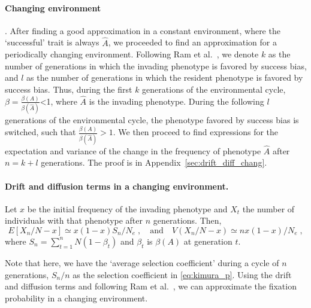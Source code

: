 \documentclass[12pt]{extarticle}
\begin{document}


\paragraph*{Changing environment}. After finding a good approximation in a constant environment, where the `successful' trait is always $\hat{A}$, we proceeded to find an approximation for a periodically changing environment. 
Following Ram et al.~\citep{changeEnv}, we denote $k$ as the number of generations in which the invading phenotype is favored by success bias, and $l$ as the number of generations in which the resident phenotype is favored by success bias.
Thus, during the first $k$ generations of the environmental cycle, $\beta=\frac{\beta(A)}{\beta(\hat{A})}$<1, where $\hat{A}$ is the invading phenotype. During the following $l$ generations of the environmental cycle, the phenotype favored by success bias is switched, such that $\frac{\beta(A)}{\beta(\hat{A})}>1$.
We then proceed to find expressions for the expectation and variance of the change in the frequency of phenotype $\hat{A}$ after $n=k+l$ generations. 
The proof is in Appendix~\ref{sec:drift_diff_chang}.
\\


\paragraph{Drift and diffusion terms in a changing environment.}
Let $x$ be the initial frequency of the invading phenotype and $X_t$ the number of individuals with that phenotype after $n$ generations.
Then,
\begin{equation}\label{eq:ch_expected_and_var}
E[X_n/N - x] \simeq x(1-x) S_n / N_e \;, 
\quad
\text{and}
\quad
V(X_n/N-x) \simeq  n x(1-x) / N_e \;,
\end{equation}
where $S_n=\sum\limits_{t=1}^{n} N (1-\beta_t)$ and $\beta_t$ is $\beta(A)$ at generation $t$. 

Note that here, we have the `average selection coefficient' during a cycle of $n$ generations, $S_n/n$ as the selection coefficient {in} \cref{eq:kimura_p}.
Using the drift and diffusion terms and following Ram et al.~\citep{changeEnv}, we can approximate the fixation probability in a changing environment.
\\
\end{document}
